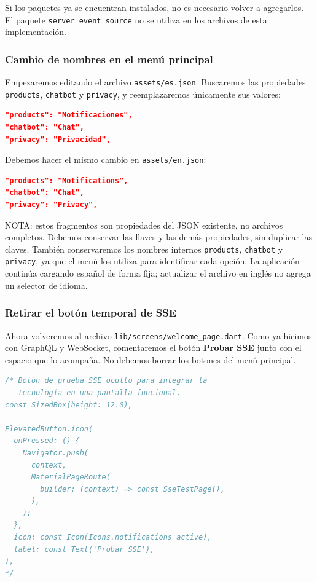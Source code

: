 Si los paquetes ya se encuentran instalados, no es necesario volver a agregarlos. El paquete \texttt{server\_event\_source} no se utiliza en los archivos de esta implementación.

\subsubsection{Cambio de nombres en el menú principal}
Empezaremos editando el archivo \texttt{assets/es.json}. Buscaremos las propiedades \texttt{products}, \texttt{chatbot} y \texttt{privacy}, y reemplazaremos únicamente sus valores:

\begin{lstlisting}[language=json, caption={Nuevos nombres en assets/es.json}]
"products": "Notificaciones",
"chatbot": "Chat",
"privacy": "Privacidad",
\end{lstlisting}

Debemos hacer el mismo cambio en \texttt{assets/en.json}:

\begin{lstlisting}[language=json, caption={Nuevos nombres en assets/en.json}]
"products": "Notifications",
"chatbot": "Chat",
"privacy": "Privacy",
\end{lstlisting}

NOTA: estos fragmentos son propiedades del JSON existente, no archivos completos. Debemos conservar las llaves y las demás propiedades, sin duplicar las claves. También conservaremos los nombres internos \texttt{products}, \texttt{chatbot} y \texttt{privacy}, ya que el menú los utiliza para identificar cada opción. La aplicación continúa cargando español de forma fija; actualizar el archivo en inglés no agrega un selector de idioma.

\subsubsection{Retirar el botón temporal de SSE}
Ahora volveremos al archivo \texttt{lib/screens/welcome\_page.dart}. Como ya hicimos con GraphQL y WebSocket, comentaremos el botón \textbf{Probar SSE} junto con el espacio que lo acompaña. No debemos borrar los botones del menú principal.

\begin{lstlisting}[language=Java, caption={Botón temporal de SSE comentado}]
/* Botón de prueba SSE oculto para integrar la
   tecnología en una pantalla funcional.
const SizedBox(height: 12.0),

ElevatedButton.icon(
  onPressed: () {
    Navigator.push(
      context,
      MaterialPageRoute(
        builder: (context) => const SseTestPage(),
      ),
    );
  },
  icon: const Icon(Icons.notifications_active),
  label: const Text('Probar SSE'),
),
*/
\end{lstlisting}

